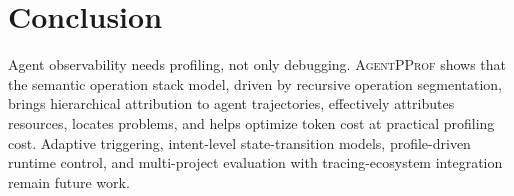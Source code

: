 \documentclass[sigconf,nonacm]{acmart}
\newcommand{\sys}{\textsc{AgentPProf}\xspace}
\begin{document}
\section{Conclusion}

Agent observability needs profiling, not only debugging.
\sys shows that the semantic operation stack model, driven by
recursive operation segmentation, brings hierarchical attribution to
agent trajectories, effectively attributes resources, locates problems, and helps optimize token cost at practical profiling cost.
Adaptive triggering, intent-level state-transition models,
profile-driven runtime control, and multi-project evaluation with
tracing-ecosystem integration remain future work.



\end{document}
